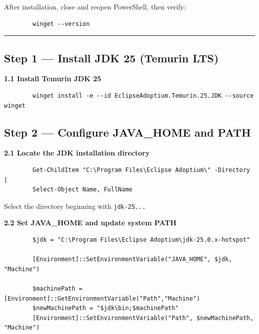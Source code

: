\documentclass[11pt,a4paper]{article}
\begin{document}
	After installation, close and reopen PowerShell, then verify:
	
	\begin{lstlisting}
		winget --version
	\end{lstlisting}
	
	\vspace{6pt}
	\hrule
	\vspace{10pt}
	
	\subsection*{Step 1 — Install JDK 25 (Temurin LTS)}
	
	\textbf{1.1 Install Temurin JDK 25}
	
	\begin{lstlisting}
		winget install -e --id EclipseAdoptium.Temurin.25.JDK --source winget
	\end{lstlisting}
	
	\vspace{6pt}
	
	\subsection*{Step 2 — Configure JAVA\_HOME and PATH}
	
	\textbf{2.1 Locate the JDK installation directory}
	
	\begin{lstlisting}
		Get-ChildItem "C:\Program Files\Eclipse Adoptium\" -Directory |
		Select-Object Name, FullName
	\end{lstlisting}
	
	Select the directory beginning with \texttt{jdk-25...}
	
	\vspace{4pt}
	
	\textbf{2.2 Set JAVA\_HOME and update system PATH}
	
	\begin{lstlisting}
		$jdk = "C:\Program Files\Eclipse Adoptium\jdk-25.0.x-hotspot"
		
		[Environment]::SetEnvironmentVariable("JAVA_HOME", $jdk, "Machine")
		
		$machinePath = [Environment]::GetEnvironmentVariable("Path","Machine")
		$newMachinePath = "$jdk\bin;$machinePath"
		[Environment]::SetEnvironmentVariable("Path", $newMachinePath, "Machine")
	\end{lstlisting}
	
\end{document}
